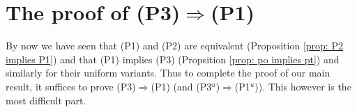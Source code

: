 \documentclass[oneside,reqno]{amsart}
\newtheorem{lemma}[theo]{Lemma}
\theoremstyle{definition}
\newcommand{\Gl}{\operatorname{GL}}
\newcommand{\s}{\sigma}
\newcommand{\ks}{$k$\=/$\s$}
\newcommand{\kn}{k^{[n]}}
\newcommand{\po}{{\rm{(P1$^u$)}}}
\newcommand{\pt}{{\rm{(P3$^u$)}}}
\newcommand{\poweak}{{\rm{(P1)}}}
\newcommand{\ptweak}{{\rm{(P3)}}}
\newcommand{\pwweak}{{\rm{(P2)}}}
\begin{document}
%
%		
%	







\section{The proof of \ptweak{}$\Rightarrow$\poweak{}}
\label{sec: The proof}

By now we have seen that \poweak{} and \pwweak{} are equivalent (Proposition \ref{prop: P2 implies P1}) and that \poweak{} implies \ptweak{} (Propsition \ref{prop: po implies pt}) and similarly for their uniform variants.
Thus to complete the proof of our main result, it suffices to prove \ptweak{}$\Rightarrow$\poweak{} (and \pt{}$\Rightarrow$\po{}). This however is the most difficult part.
\end{document}
